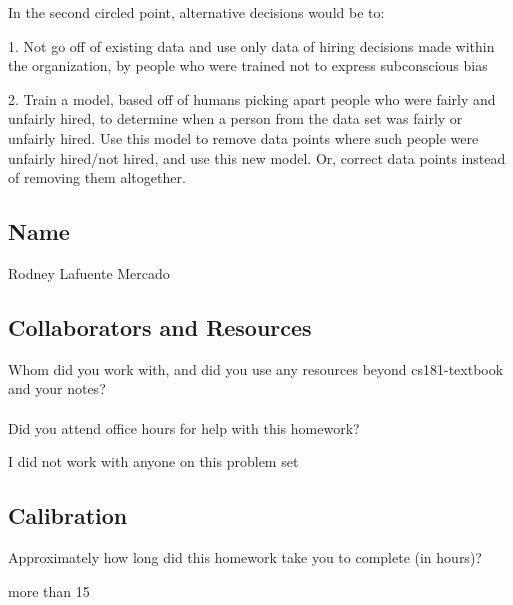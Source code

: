 \documentclass[submit]{harvardml}
\begin{document}
In the second circled point, alternative decisions would be to:

1. Not go off of existing data and use only data of hiring decisions made 
within the organization, by people who were trained not to express
subconscious bias

2. Train a model, based off of humans picking apart people who were fairly and 
unfairly hired, to determine when a person from the data set was fairly or unfairly
hired. Use this model to remove data points where such people were unfairly hired/not hired,
and use this new model. Or, correct data points instead of removing them altogether.


\newpage
\subsection*{Name}
Rodney Lafuente Mercado

\subsection*{Collaborators and Resources}
Whom did you work with, and did you use any resources beyond cs181-textbook and your notes?\\
\\
Did you attend office hours for help with this homework?

I did not work with anyone on this problem set

\subsection*{Calibration}
Approximately how long did this homework take you to complete (in hours)? 

more than 15
\end{document}
